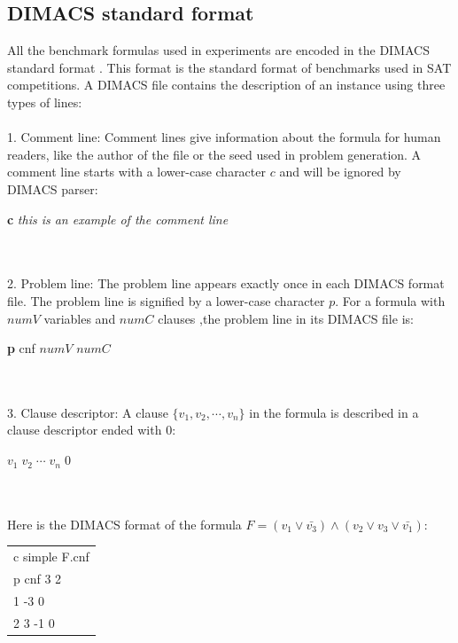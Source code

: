 \documentclass[12pt,a4paper,twoside]{scrartcl}
\numberwithin{equation}{section}
\begin{document}
\subsection{DIMACS standard format}  
All the benchmark formulas used in experiments are encoded in the DIMACS standard format \cite{balyo2017proceedings}. This format is the standard format of benchmarks used in SAT competitions. A DIMACS file contains the description of an instance using three types of lines:\\
\\ 1. Comment line: Comment lines give information about the formula for human readers, like the author of the file or the seed used in problem generation. A comment line starts with a lower-case character $c$ and will be ignored by DIMACS parser:\\ \centerline{\textbf{c} \emph{ this is an example of the comment line }}\\ \\ 2. Problem line: The problem line appears exactly once in each DIMACS format file. The problem line is signified by a lower-case character $p$.  For a formula with $numV$ variables and $numC$ clauses ,the problem line in its DIMACS file is:\\ \centerline{\textbf{p} cnf $numV$ $numC$}\\ \\ 3. Clause descriptor: A clause $\{v_1, v_2,\cdots, v_n\}$ in the formula is described in a clause descriptor ended with $0$:\\ \centerline{ $v_1\; v_2\;\cdots  \;v_n\;0$}\\  
\\
Here is the DIMACS format of the formula $F = (v_1 \lor \bar{v_3}) \land (v_2 \lor v_3 \lor \bar{v_1})$:
\begin{center}
\begin{tabular}{l}
c simple F.cnf\\
p cnf 3 2\\
1 -3 0\\
2 3 -1 0 \\
\end{tabular}
\end{center}
\end{document}
